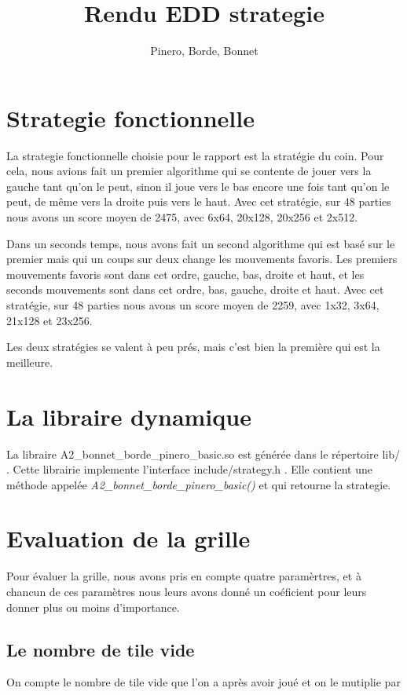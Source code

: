 \documentclass{article}
\title{Rendu EDD strategie}
\author{Pinero, Borde, Bonnet}
\begin{document}
\maketitle
\tableofcontents

\newpage
\section{Strategie fonctionnelle}
La strategie fonctionnelle choisie pour le rapport est la stratégie du coin. Pour cela, nous avions fait un premier algorithme qui se contente de jouer vers la gauche tant qu'on le peut, sinon il joue vers le bas encore une fois tant qu'on le peut, de même vers la droite puis vers le haut. Avec cet stratégie, sur 48 parties nous avons un score moyen de 2475, avec 6x64, 20x128, 20x256 et 2x512.

Dans un seconds temps, nous avons fait un second algorithme qui est basé sur le premier mais qui un coups sur deux change les mouvements favoris. Les premiers mouvements favoris sont dans cet ordre, gauche, bas, droite et haut, et les seconds mouvements sont dans cet ordre, bas, gauche, droite et haut. Avec cet stratégie, sur 48 parties nous avons un score moyen de 2259, avec 1x32, 3x64, 21x128 et 23x256.

Les deux stratégies se valent à peu prés, mais c'est bien la première qui est la meilleure.

\section{La libraire dynamique}
La libraire A2\_bonnet\_borde\_pinero\_basic.so est g\'en\'er\'ee dans le r\'epertoire \og lib/ \fg{}. Cette librairie implemente l'interface \og include/strategy.h \fg{}. Elle contient une m\'ethode appel\'ee {\itshape A2\_bonnet\_borde\_pinero\_basic()} et qui retourne la strategie.

\clearpage
\section{Evaluation de la grille}
\label{eval_grid}
Pour évaluer la grille, nous avons pris en compte quatre paramèrtres, et à chancun de ces paramètres nous leurs avons donné un coéficient pour leurs donner plus ou moins d'importance. 


	\subsection{Le nombre de tile vide}
	On compte le nombre de tile vide que l'on a après avoir joué et on le mutiplie par
\end{document}

